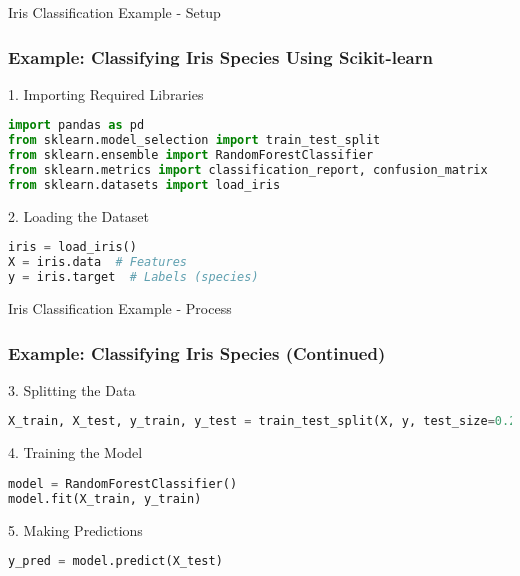 \documentclass[aspectratio=169]{beamer}
\begin{document}
\begin{frame}[fragile]{Iris Classification Example - Setup}
    \frametitle{Example: Classifying Iris Species Using Scikit-learn}
    
    \begin{block}{1. Importing Required Libraries}
        \begin{lstlisting}[language=Python]
import pandas as pd
from sklearn.model_selection import train_test_split
from sklearn.ensemble import RandomForestClassifier
from sklearn.metrics import classification_report, confusion_matrix
from sklearn.datasets import load_iris
        \end{lstlisting}
    \end{block}

    \begin{block}{2. Loading the Dataset}
        \begin{lstlisting}[language=Python]
iris = load_iris()
X = iris.data  # Features
y = iris.target  # Labels (species)
        \end{lstlisting}
    \end{block}
\end{frame}

\begin{frame}[fragile]{Iris Classification Example - Process}
    \frametitle{Example: Classifying Iris Species (Continued)}
    
    \begin{block}{3. Splitting the Data}
        \begin{lstlisting}[language=Python]
X_train, X_test, y_train, y_test = train_test_split(X, y, test_size=0.2, random_state=42)
        \end{lstlisting}
    \end{block}

    \begin{block}{4. Training the Model}
        \begin{lstlisting}[language=Python]
model = RandomForestClassifier()
model.fit(X_train, y_train)
        \end{lstlisting}
    \end{block}

    \begin{block}{5. Making Predictions}
        \begin{lstlisting}[language=Python]
y_pred = model.predict(X_test)
        \end{lstlisting}
    \end{block}
\end{frame}
\end{document}
